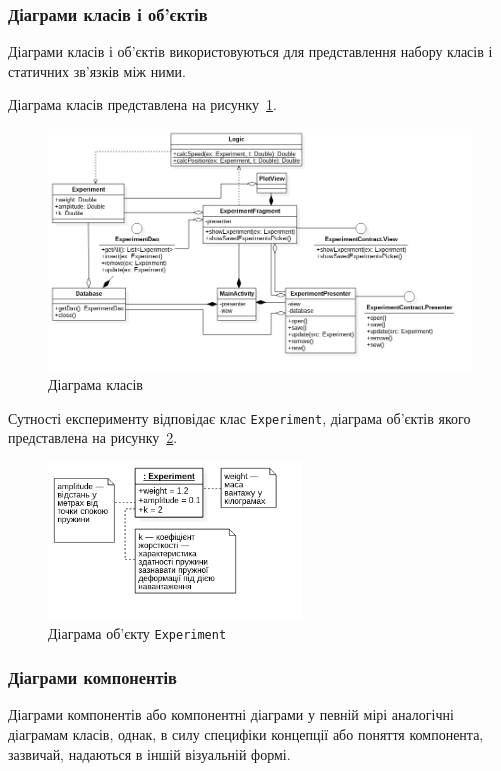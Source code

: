 \subsubsection{Діаграми класів і об’єктів}
Діаграми класів і об’єктів використовуються для представлення набору класів і статичних зв'язків між ними.

Діаграма класів представлена на рисунку~\ref{fig:uml_class}.

\begin{figure}[H]
  \centering
    \includegraphics[width=1\textwidth]{uml_class}
  \caption{Діаграма класів}
  \label{fig:uml_class}
\end{figure}

Сутності експерименту відповідає клас \texttt{Experiment}, діаграма об'єктів якого представлена на рисунку~\ref{fig:uml_object_experiment}.

\begin{figure}[H]
  \centering
    \includegraphics[width=0.6\textwidth]{uml_object_experiment}
  \caption{Діаграма об'єкту \texttt{Experiment}}
  \label{fig:uml_object_experiment}
\end{figure}

\subsubsection{Діаграми компонентів}
Діаграми компонентів або компонентні діаграми у певній мірі аналогічні діаграмам класів, однак, в силу специфіки концепції або поняття компонента, зазвичай, надаються в іншій візуальній формі.

